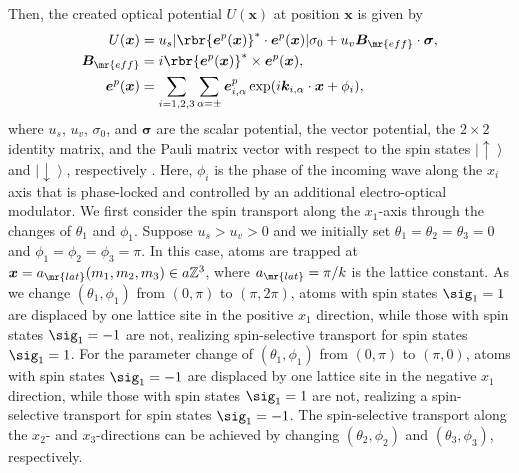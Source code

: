 \documentclass[
floatfix,
pra,
twocolumn,
reprint,
amsmath,amssymb,
aps,
footnote,
]{revtex4}
\begin{document}
Then, the created optical potential $U(\bm{x})$ at position $\bm{x}$ is given by
\begin{align}
	U(\bm{x}) &= u_s |\rbr{\bm{e}^p(\bm{x})}^\ast \cdot \bm{e}^p(\bm{x})| \sigma_0
	+ u_v \bm{B}_{\mr{eff}}\cdot \bm{\sigma}
	, \nonumber \\
	\bm{B}_{\mr{eff}} &= i \rbr{\bm{e}^p(\bm{x})}^\ast \times \bm{e}^p(\bm{x})
	, \nonumber \\
	\bm{e}^p(\bm{x}) &= \sum_{i=1,2,3}\sum_{\alpha = \pm}
	\bm{e}^p_{i, \alpha} \exp(i \bm{k}_{i, \alpha} \cdot \bm{x} + \phi_i)
	,
\end{align}
where $u_s$, $u_v$, $\sigma_0$, and $\bm{\sigma}$ are the scalar potential, the vector potential, the $2 \times 2$ identity matrix, and the Pauli matrix vector with respect to the spin states $\left| \uparrow \right>$ and $\left| \downarrow \right>$, respectively \cite{Goldman14b}.
Here, $\phi_i$ is the phase of the incoming wave along the $x_i$ axis that is phase-locked and controlled by an additional electro-optical modulator.
We first consider the spin transport along the $x_1$-axis through the changes of $\theta_1$ and $\phi_1$.
Suppose $u_s > u_v > 0$ and we initially set $\theta_1 = \theta_2 = \theta_3 = 0$ and $\phi_1 = \phi_2 = \phi_3 = \pi$.
In this case, atoms are trapped at $\bm{x} = a_{\mr{lat}}(m_1, m_2, m_3) \in a \mathbb{Z}^3$, where $a_{\mr{lat}} = \pi/k$ is the lattice constant.
As we change $(\theta_1, \phi_1)$ from $(0, \pi)$ to $(\pi, 2\pi)$, atoms with spin states $\sig_1 = 1$ are displaced by one lattice site in the positive $x_1$ direction, while those with spin states $\sig_1 = -1$ are not, realizing spin-selective transport for spin states $\sig_1 = 1$.
For the parameter change of $(\theta_1, \phi_1)$ from $(0, \pi)$ to $(\pi, 0)$, atoms with spin states $\sig_1 = -1$ are displaced by one lattice site in the negative $x_1$ direction, while those with spin states $\sig_1 = 1$ are not, realizing a spin-selective transport for spin states $\sig_1 = -1$.
The spin-selective transport along the $x_2$- and $x_3$-directions can be achieved by changing $(\theta_2, \phi_2)$ and $(\theta_3, \phi_3)$, respectively.
\end{document}
